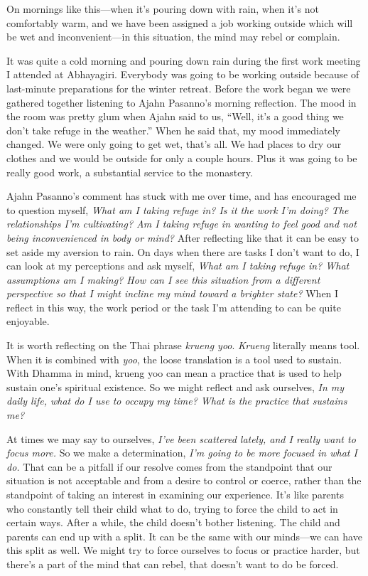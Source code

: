 On mornings like this---when it's pouring down with rain, when it's not 
comfortably warm, and we have been assigned a job working outside which 
will be wet and inconvenient---in this situation, the mind may rebel or 
complain.

It was quite a cold morning and pouring down rain during the first work 
meeting I attended at Abhayagiri. Everybody was going to be working 
outside because of last-minute preparations for the winter retreat. 
Before the work began we were gathered together listening to Ajahn 
Pasanno's morning reflection. The mood in the room was pretty glum when 
Ajahn said to us, ``Well, it's a good thing we don't take refuge in the 
weather.'' When he said that, my mood immediately changed. We were only 
going to get wet, that's all. We had places to dry our clothes and we 
would be outside for only a couple hours. Plus it was going to be 
really good work, a substantial service to the monastery.

Ajahn Pasanno's comment has stuck with me over time, and has encouraged 
me to question myself, \emph{What am I taking refuge in? Is it the work 
I'm doing? The relationships I'm cultivating? Am I taking refuge in 
wanting to feel good and not being inconvenienced in body or mind?} 
After reflecting like that it can be easy to set aside my aversion to 
rain. On days when there are tasks I don't want to do, I can look at my 
perceptions and ask myself, \emph{What am I taking refuge in? What 
assumptions am I making? How can I see this situation from a different 
perspective so that I might incline my mind toward a brighter state?} 
When I reflect in this way, the work period or the task I'm attending 
to can be quite enjoyable.


It is worth reflecting on the Thai phrase \emph{krueng yoo}. 
\emph{Krueng} literally means tool. When it is combined with 
\emph{yoo}, the loose translation is a tool used to sustain. With 
Dhamma in mind, krueng yoo can mean a practice that is used to help 
sustain one's spiritual existence. So we might reflect and ask 
ourselves, \emph{In my daily life, what do I use to occupy my time? 
What is the practice that sustains me?}

At times we may say to ourselves, \emph{I've been scattered lately, and 
I really want to focus more.} So we make a determination, \emph{I'm 
going to be more focused in what I do.} That can be a pitfall if our 
resolve comes from the standpoint that our situation is not acceptable 
and from a desire to control or coerce, rather than the standpoint of 
taking an interest in examining our experience. It's like parents who 
constantly tell their child what to do, trying to force the child to 
act in certain ways. After a while, the child doesn't bother listening. 
The child and parents can end up with a split. It can be the same with 
our minds---we can have this split as well. We might try to force 
ourselves to focus or practice harder, but there's a part of the mind 
that can rebel, that doesn't want to do be forced.

